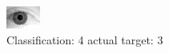 \begin{figure}[h!]
\begin{center}
\includegraphics[width=0.60\columnwidth]{figures/ID2210_class_4_target_3.png}
\end{center}
\caption{ Classification: 4 actual target: 3}
\label{fig:ID2210_class_4_target_3}
\end{figure}
